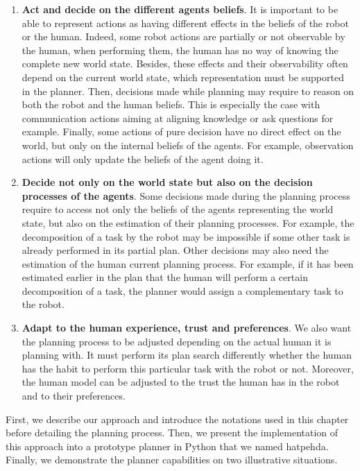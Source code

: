 \documentclass[a4paper,11pt,twoside]{StyleThese}
\begin{document}
\begin{enumerate}
\item \textbf{Act and decide on the different agents beliefs}. It is important to be able to represent actions as having different effects in the beliefs of the robot or the human. Indeed, some robot actions are partially or not observable by the human, when performing them, the human has no way of knowing the complete new world state. Besides, these effects and their observability often depend on the current world state, which representation must be supported in the planner. Then, decisions made while planning may require to reason on both the robot and the human beliefs. This is especially the case with communication actions aiming at aligning knowledge or ask questions for example. Finally, some actions of pure decision have no direct effect on the world, but only on the internal beliefs of the agents. For example, observation actions will only update the beliefs of the agent doing it.

\item \textbf{Decide not only on the world state but also on the decision processes of the agents}. Some decisions made during the planning process require to access not only the beliefs of the agents representing the world state, but also on the estimation of their planning processes. For example, the decomposition of a task by the robot may be impossible if some other task is already performed in its partial plan. Other decisions may also need the estimation of the human current planning process. For example, if it has been estimated earlier in the plan that the human will perform a certain decomposition of a task, the planner would assign a complementary task to the robot.

\item \textbf{Adapt to the human experience, trust and preferences}. We also want the planning process to be adjusted depending on the actual human it is planning with. It must perform its plan search differently whether the human has the habit to perform this particular task with the robot or not. Moreover, the human model can be adjusted to the trust the human has in the robot and to their preferences. 
\end{enumerate}

First, we describe our approach and introduce the notations used in this chapter before detailing the planning process. Then, we present the implementation of this approach into a prototype planner in Python that we named \acrfull{hatpehda}. Finally, we demonstrate the planner capabilities on two illustrative situations.
\end{document}

